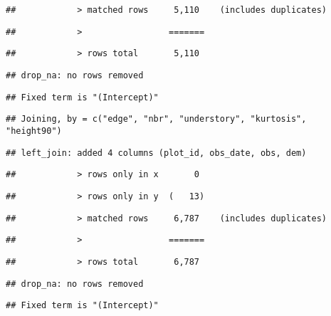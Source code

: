 \documentclass[
]{article}
\begin{document}
\begin{verbatim}
##            > matched rows     5,110    (includes duplicates)
\end{verbatim}

\begin{verbatim}
##            >                 =======
\end{verbatim}

\begin{verbatim}
##            > rows total       5,110
\end{verbatim}

\begin{verbatim}
## drop_na: no rows removed
\end{verbatim}

\begin{verbatim}
## Fixed term is "(Intercept)"
\end{verbatim}

\begin{verbatim}
## Joining, by = c("edge", "nbr", "understory", "kurtosis", "height90")
\end{verbatim}

\begin{verbatim}
## left_join: added 4 columns (plot_id, obs_date, obs, dem)
\end{verbatim}

\begin{verbatim}
##            > rows only in x       0
\end{verbatim}

\begin{verbatim}
##            > rows only in y  (   13)
\end{verbatim}

\begin{verbatim}
##            > matched rows     6,787    (includes duplicates)
\end{verbatim}

\begin{verbatim}
##            >                 =======
\end{verbatim}

\begin{verbatim}
##            > rows total       6,787
\end{verbatim}

\begin{verbatim}
## drop_na: no rows removed
\end{verbatim}

\begin{verbatim}
## Fixed term is "(Intercept)"
\end{verbatim}
\end{document}
